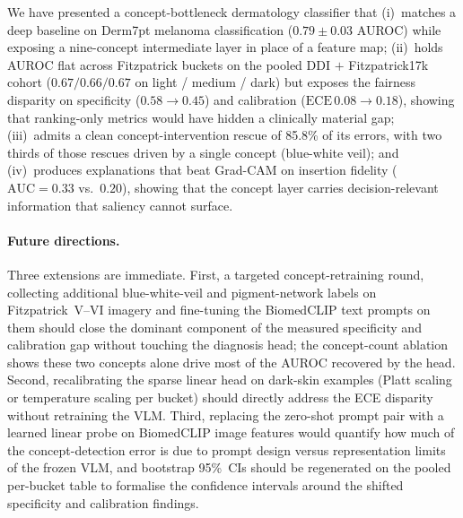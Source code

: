 \documentclass[sigconf,nonacm,screen]{acmart}
\begin{document}
We have presented a concept-bottleneck dermatology classifier that
(i)~matches a deep baseline on Derm7pt melanoma classification
($0.79\!\pm\!0.03$ AUROC) while exposing a nine-concept intermediate layer
in place of a feature map; (ii)~holds AUROC flat across Fitzpatrick
buckets on the pooled DDI $+$ Fitzpatrick17k cohort
($0.67 / 0.66 / 0.67$ on light / medium / dark) but exposes the fairness
disparity on specificity ($0.58 \to 0.45$) and calibration
($\mathrm{ECE}\, 0.08 \to 0.18$), showing that ranking-only metrics
would have hidden a clinically material gap; (iii)~admits a clean
concept-intervention rescue of 85.8\% of its errors, with two thirds of
those rescues driven by a single concept (blue-white veil); and
(iv)~produces explanations that beat Grad-CAM on insertion fidelity
($\mathrm{AUC}=0.33$ vs.\ $0.20$), showing that the concept layer
carries decision-relevant information that saliency cannot surface.

\paragraph{Future directions.}
Three extensions are immediate. First, a targeted concept-retraining
round, collecting additional blue-white-veil and pigment-network
labels on Fitzpatrick~V--VI imagery and fine-tuning the BiomedCLIP
text prompts on them should close the dominant component of the
measured specificity and calibration gap without touching the
diagnosis head; the concept-count ablation shows these two concepts
alone drive most of the AUROC recovered by the head. Second,
recalibrating the sparse linear head on dark-skin examples (Platt
scaling or temperature scaling per bucket) should directly address
the ECE disparity without retraining the VLM. Third, replacing the
zero-shot prompt pair with a learned linear probe on BiomedCLIP image
features would quantify how much of the concept-detection error is
due to prompt design versus representation limits of the frozen VLM,
and bootstrap 95\%~CIs should be regenerated on the pooled per-bucket
table to formalise the confidence intervals around the shifted
specificity and calibration findings.
\end{document}
